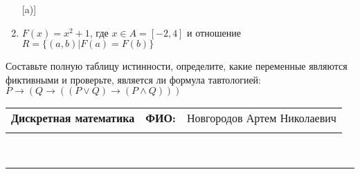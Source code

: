 \documentclass[10pt]{exam}
\newcommand{\class}{Дискретная математика}
\newcommand{\examdate}{}
\begin{document}
\begin{questions}
\begin{enumerate} [a)]
\item $F(x)=x^{2}+1$, где $x \in A = [-2, 4]$ и отношение $R = \{(a,b)|F(a) = F(b)\}$
\end{enumerate}\question Составьте полную таблицу истинности, определите, какие переменные являются фиктивными и проверьте, является ли формула тавтологией:
$ P \rightarrow (Q \rightarrow ((P \lor Q) \rightarrow (P \land Q)))$

\end{questions}
\newpage
\begin{flushright}
\begin{tabular}{p{2.8in} r l}
\textbf{\class} & \textbf{ФИО:} &Новгородов Артем Николаевич
\\

\textbf{\examdate} &&\\
\end{tabular}\\
\end{flushright}
\rule[1ex]{\textwidth}{.1pt}
\end{document}
